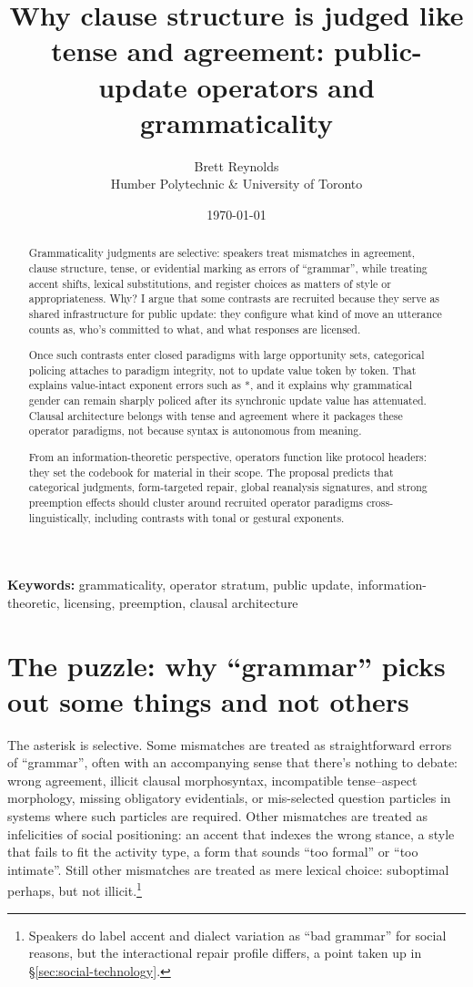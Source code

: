 \documentclass[12pt,letterpaper]{article}
\title{Why clause structure is judged like tense and agreement: public-update operators and grammaticality}
\author{Brett Reynolds \orcidlink{0000-0003-0073-7195}\\Humber Polytechnic \& University of Toronto}
\date{\today}
\begin{document}
\maketitle

\begin{abstract}
Grammaticality judgments are selective: speakers treat mismatches in agreement, clause structure, tense, or evidential marking as errors of \enquote{grammar}, while treating accent shifts, lexical substitutions, and register choices as matters of style or appropriateness. Why? I argue that some contrasts are recruited because they serve as shared infrastructure for public update: they configure what kind of move an utterance counts as, who's committed to what, and what responses are licensed.

Once such contrasts enter closed paradigms with large opportunity sets, categorical policing attaches to paradigm integrity, not to update value token by token. That explains value-intact exponent errors such as *, and it explains why grammatical gender can remain sharply policed after its synchronic update value has attenuated. Clausal architecture belongs with tense and agreement where it packages these operator paradigms, not because syntax is autonomous from meaning.

From an information-theoretic perspective, operators function like protocol headers: they set the codebook for material in their scope. The proposal predicts that categorical judgments, form-targeted repair, global reanalysis signatures, and strong preemption effects should cluster around recruited operator paradigms cross-linguistically, including contrasts with tonal or gestural exponents.
\end{abstract}

\smallskip
\noindent \textbf{Keywords:} grammaticality, operator stratum, public update, information-theoretic, licensing, preemption, clausal architecture


\section{The puzzle: why \enquote{grammar} picks out some things and not others}

The asterisk is selective. Some mismatches are treated as straightforward errors of \enquote{grammar}, often with an accompanying sense that there's nothing to debate: wrong agreement, illicit clausal morphosyntax, incompatible tense--aspect morphology, missing obligatory evidentials, or mis-selected question particles in systems where such particles are required. Other mismatches are treated as infelicities of social positioning: an accent that indexes the wrong stance, a style that fails to fit the activity type, a form that sounds \enquote{too formal} or \enquote{too intimate}. Still other mismatches are treated as mere lexical choice: suboptimal perhaps, but not illicit.\footnote{Speakers do label accent and dialect variation as \enquote{bad grammar} for social reasons, but the interactional repair profile differs, a point taken up in \S\ref{sec:social-technology}.}
\end{document}
